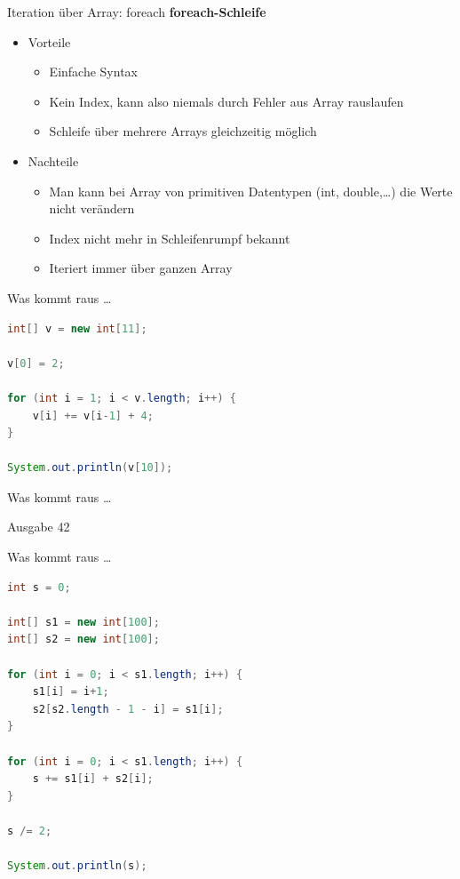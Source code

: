 \documentclass[18pt]{beamer}
\begin{document}
\begin{frame}{Iteration über Array: foreach}
    \textbf{foreach-Schleife}
    \begin{itemize}
        \item Vorteile
        \begin{itemize}
            \item Einfache Syntax
            \item Kein Index, kann also niemals durch Fehler aus Array rauslaufen
            \item Schleife über mehrere Arrays gleichzeitig möglich

        \end{itemize}
        \pause
        \item Nachteile
        \begin{itemize}
            \item Man kann bei Array von primitiven Datentypen (int, double,\dots) die Werte nicht verändern
            \item Index nicht mehr in Schleifenrumpf bekannt
            \item Iteriert immer über ganzen Array
        \end{itemize}
    \end{itemize}
\end{frame}

\begin{frame}[fragile]{Was kommt raus \dots}
    \begin{lstlisting}[language=Java]
int[] v = new int[11];

v[0] = 2;

for (int i = 1; i < v.length; i++) {
    v[i] += v[i-1] + 4;
}

System.out.println(v[10]);
    \end{lstlisting}

\end{frame}

\begin{frame}{Was kommt raus \dots}
    \begin{exampleblock}{Ausgabe}
        42
    \end{exampleblock}
\end{frame}

\begin{frame}[fragile]{Was kommt raus \dots}
    \begin{lstlisting}[language=Java,basicstyle=\scriptsize]
int s = 0;

int[] s1 = new int[100];
int[] s2 = new int[100];

for (int i = 0; i < s1.length; i++) {
    s1[i] = i+1;
    s2[s2.length - 1 - i] = s1[i];
}

for (int i = 0; i < s1.length; i++) {
    s += s1[i] + s2[i];
}

s /= 2;

System.out.println(s);
    \end{lstlisting}

\end{frame}
\end{document}
